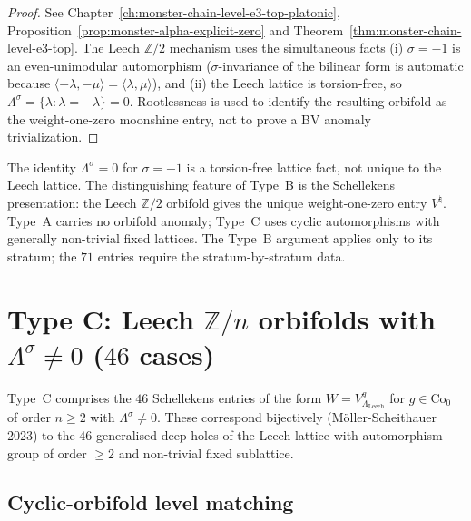 \begin{proof}
See Chapter~\ref*{ch:monster-chain-level-e3-top-platonic},
Proposition~\ref*{prop:monster-alpha-explicit-zero} and
Theorem~\ref*{thm:monster-chain-level-e3-top}.
The Leech $\mathbb{Z}/2$ mechanism uses the simultaneous facts
(i) $\sigma = -1$ is an even-unimodular automorphism ($\sigma$-invariance
of the bilinear form is automatic because $\langle -\lambda, -\mu
\rangle = \langle \lambda, \mu \rangle$), and
(ii) the Leech lattice is torsion-free, so
$\Lambda^\sigma=\{\lambda: \lambda=-\lambda\}=0$. Rootlessness is used
to identify the resulting orbifold as the weight-one-zero moonshine
entry, not to prove a BV anomaly trivialization.
\end{proof}

\begin{remark}
\label{rem:schellekens-typeB-non-generalisable}
The identity $\Lambda^\sigma=0$ for $\sigma=-1$ is a torsion-free
lattice fact, not unique to the Leech lattice. The distinguishing
feature of Type~B is the Schellekens presentation: the Leech
$\mathbb Z/2$ orbifold gives the unique weight-one-zero entry
$V^\natural$. Type~A carries no orbifold anomaly; Type~C uses cyclic
automorphisms with generally non-trivial fixed lattices. The Type~B
argument applies only to its stratum; the $71$ entries require the
stratum-by-stratum data.
\end{remark}

\section{Type C: Leech $\mathbb{Z}/n$ orbifolds with
$\Lambda^\sigma \ne 0$ ($46$ cases)}
\label{sec:schellekens-typeC-level-matching}

Type~C comprises the $46$ Schellekens entries of the form
$W = V_{\Lambda_{\mathrm{Leech}}}^g$ for $g \in \mathrm{Co}_0$ of
order $n \ge 2$ with $\Lambda^\sigma \ne 0$. These correspond
bijectively (M\"oller-Scheithauer 2023) to the $46$ generalised deep
holes of the Leech lattice with automorphism group of order $\ge 2$
and non-trivial fixed sublattice.

\subsection{Cyclic-orbifold level matching}

